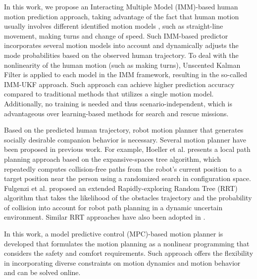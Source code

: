 \documentclass[letterpaper, 10 pt, conference]{ieeeconf}
\begin{document}
	In this work, we propose an Interacting Multiple Model (IMM)-based human motion prediction approach, taking advantage of the fact that human motion usually involves different identified motion models \cite{aggarwal1999human}, such as straight-line movement, making turns and change of speed.
	Such IMM-based predictor incorporates several motion models into account and dynamically adjusts the mode probabilities based on the observed human trajectory.
	To deal with the nonlinearity of the human motion (such as making turns), Unscented Kalman Filter is applied to each model in the IMM framework, resulting in the so-called IMM-UKF approach.
	Such approach can achieve higher prediction accuracy compared to traditional methods that utilizes a single motion model. 
	Additionally, no training is needed and thus scenario-independent, which is advantageous over learning-based methods for search and rescue missions.
	
	Based on the predicted human trajectory, robot motion planner that generates socially desirable companion behavior is necessary. 
	Several motion planner have been proposed in previous work.
	For example, Hoeller et al.\cite{hoeller2007accompanying} presents a local path planning approach based on the expansive-spaces tree algorithm, which repeatedly computes collision-free paths from the robot’s current position to a target position near the person using a randomized search in configuration space.
	Fulgenzi et al.\cite{fulgenzi2008probabilistic} proposed an extended Rapidly-exploring Random Tree (RRT) algorithm that takes the likelihood of the obstacles trajectory and the probability of collision into account for robot path planning in a dynamic uncertain environment.
	Similar RRT approaches have also been adopted in \cite{barnaud2014proxemics,rios2011understanding}.
	
	In this work, a model predictive control (MPC)-based motion planner is developed that formulates the motion planning as a nonlinear programming that considers the safety and comfort requirements.
	Such approach offers the flexibility in incorporating diverse constraints on motion dynamics and motion behavior and can be solved online.	
	
\end{document}
